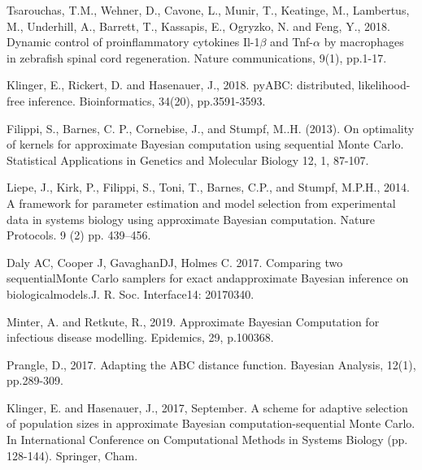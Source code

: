 \documentclass[12pt,a4paper]{report}
\begin{document}
\begin{thebibliography}{100}

 Tsarouchas, T.M., Wehner, D., Cavone, L., Munir, T., Keatinge, M., Lambertus, M., Underhill, A., Barrett, T., Kassapis, E., Ogryzko, N. and Feng, Y., 2018. Dynamic control of proinflammatory cytokines Il-1$\beta$ and Tnf-$\alpha$ by macrophages in zebrafish spinal cord regeneration. Nature communications, 9(1), pp.1-17.

 Klinger, E., Rickert, D. and Hasenauer, J., 2018. pyABC: distributed, likelihood-free inference. Bioinformatics, 34(20), pp.3591-3593.

 Filippi, S., Barnes, C. P., Cornebise, J., and Stumpf, M..H. (2013). On optimality of kernels for approximate Bayesian computation using sequential Monte Carlo. Statistical Applications in Genetics and Molecular Biology 12, 1, 87-107.

 Liepe, J., Kirk, P., Filippi, S., Toni, T., Barnes, C.P., and Stumpf, M.P.H., 2014. A framework for parameter estimation and model selection from experimental data in systems biology using approximate Bayesian computation. Nature Protocols. 9 (2) pp. 439–456. 

 Daly AC, Cooper J, GavaghanDJ, Holmes C. 2017. Comparing two sequentialMonte Carlo samplers for exact andapproximate Bayesian inference on biologicalmodels.J. R. Soc. Interface14: 20170340.

 Minter, A. and Retkute, R., 2019. Approximate Bayesian Computation for infectious disease modelling. Epidemics, 29, p.100368.

 Prangle, D., 2017. Adapting the ABC distance function. Bayesian Analysis, 12(1), pp.289-309.

 Klinger, E. and Hasenauer, J., 2017, September. A scheme for adaptive selection of population sizes in approximate Bayesian computation-sequential Monte Carlo. In International Conference on Computational Methods in Systems Biology (pp. 128-144). Springer, Cham.

\end{thebibliography}
\end{document}
